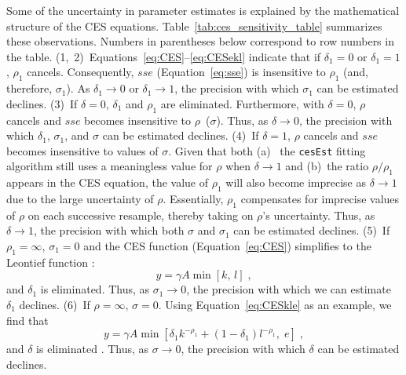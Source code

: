 \documentclass[preprint,authoryear,12pt]{elsarticle}\usepackage[]{graphicx}\usepackage[]{color}
\begin{document}
Some of the uncertainty in parameter estimates is explained by 
the mathematical structure of the CES equations.
Table~\ref{tab:ces_sensitivity_table} summarizes these observations.
Numbers in parentheses below correspond to row numbers in the table.
(1,~2)~Equations~\ref{eq:CES}--\ref{eq:CESekl} indicate that 
if $\delta_1 = 0$
or $\delta_1 = 1$,
$\rho_1$ cancels.
Consequently, 
$sse$ (Equation~\ref{eq:sse}) is insensitive to $\rho_1$ (and, therefore, $\sigma_1$).
As $\delta_1 \rightarrow 0$ or $\delta_1 \rightarrow 1$,
the precision with which $\sigma_1$ can be estimated declines.
%
(3)~If $\delta = 0$, $\delta_1$ and $\rho_1$ are eliminated.
Furthermore, with $\delta = 0$, $\rho$ cancels
and $sse$ becomes insensitive to $\rho$~($\sigma$).
Thus, as $\delta \rightarrow 0$, the precision with which 
$\delta_1$, $\sigma_1$, and $\sigma$ can be estimated declines.
%
(4)~If $\delta = 1$, $\rho$ cancels
and $sse$ becomes insensitive to values of $\sigma$.
Given that both 
(a)~ the \texttt{cesEst} fitting algorithm
still uses a meaningless value for $\rho$ when $\delta \rightarrow 1$ and 
(b)~the ratio $\rho/\rho_1$ appears in the CES equation,
the value of $\rho_1$ will also become imprecise
as $\delta \rightarrow 1$
due to the large uncertainty of $\rho$.
Essentially, $\rho_1$ compensates for imprecise values of $\rho$
on each successive resample,
thereby taking on $\rho$'s uncertainty.
Thus, as $\delta \rightarrow 1$, 
the precision with which both $\sigma$ and $\sigma_1$ can be estimated declines.
%
(5)~If $\rho_1 = \infty$, $\sigma_1 = 0$
and the CES function (Equation~\ref{eq:CES}) simplifies to the Leontief function
\citep{Csontos:1992aa}:
%
\begin{equation} \label{eq:ces_simplified_2_terms}
  y = \gamma A \min \left[ k, \, l \right] \; ,
\end{equation}
%
and $\delta_1$ is eliminated.
Thus, as $\sigma_1 \rightarrow 0$, 
the precision with which we can estimate $\delta_1$ declines.
%
(6)~If $\rho = \infty$, $\sigma = 0$.
Using Equation~\ref{eq:CESkle} as an example, we find that 
%
\begin{equation} \label{eq:ces_simplifies_3_terms}
  y = \gamma A \min \left[ \delta_1 k^{-\rho_1} + (1-\delta_1) l^{-\rho_1}, \; e \right] \; ,
\end{equation}
%
and $\delta$ is eliminated \citep{Csontos:1992aa}.
Thus, as $\sigma \rightarrow 0$, the precision with which $\delta$ can be estimated declines.
\end{document}
